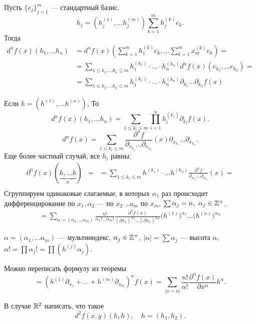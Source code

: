 \begin{thm}[частный случай, $ X = \R^{m} ~\R^{n}$]
    Пусть $ \{e_j\}_{j=1}^{m}$ --- стандартный базис.
    \[
	h_j = \left( h_j^{(1)}, \ldots h_j^{(m)} \right)  \sum_{k=1}^{m} h_{j}^{(k)} e_k 
    .\] 
    Тогда
	\[
	\begin{aligned}
	d^{n}f(x) (h_1, \ldots h_n) & = d^{n}f(x) \left( \sum_{k=1}^{m} h_1^{(k)} e_k, \ldots \sum_{k=1}^{m} x_m^{(k)}e_k \right) = \\
								&= \sum_{1 \le k_1, \ldots k_n \le m}^{} h_1^{(k_1)}\cdot  \ldots  \cdot h_n^{(k_n)} d^{n}f(x)(e_{k_1}, \ldots e_{k_n}) = \\
								&= \sum_{1 \le  k_1, \ldots k_n \le m}^{}  h_1^{(k_1)} \cdot \ldots \cdot h_n^{(k_n)} \partial _{k_1} \ldots \partial _{k_n}f(x)
	\end{aligned}
	\]
\end{thm}

\begin{thm}[еще более частный случай, $ X = \R^{m} , Y = \R, h_i = h_j$ ]
	Если $ h = (h^{(1)}, \ldots h^{(n)})$, То
    \[
		d^{n}f(x) (h_1, \ldots h_n) = \sum_{1 \le k_i \le m} \prod_{i=1}^{n} h_i^{(k_j)}\partial _{ k_i } f(x)
    .\] 
	\[
		d^{n}f(x) = \sum_{1 \le k_i \le m}^{} \frac{\partial ^{n} f}{\partial _{x_{k_1}} \ldots \partial _{x_{k_n}}} (x) \partial _{x_{k_1}} \ldots \partial _{x_{k_n}} 
	.\] 
	Еще более частный случай, все $ h_i$ равны:
	\[
	\begin{aligned}
		\partial ^{n} f(x) (\underbrace{h, \ldots h}_{n}) & = 
														  & = \sum_{1 \le k_i \le m}^{} h^{(k_1)} \cdot  \ldots h^{(k_n)}\frac{\partial ^{n} f}{\partial _{x_{k_1}} \ldots \partial _{ x_{k_n} } } (x) =\\
	\end{aligned}
    \] 
	Сгруппируем одинаковые слагаемые, в которых $ \alpha _1$ раз происходит дифференцирование по $ x_1, \alpha _2$ --- по $ x_2$  \ldots $ a_m$ по  $ x_m$, $ \sum \alpha _j = n, ~ \alpha _j \in \mathbb{Z}^{+} $.
	\[
	\begin{aligned}
=\sum_{\alpha = (\alpha _1, \ldots \alpha _m)} \frac{n!}{\alpha _1! \ldots \alpha _m!} \frac{\partial ^{n}f(x)}{(\partial x_1)^{\alpha _1} \ldots (\partial x_1)^{\alpha _m}}
\bigl(h^{(1)}\bigr)^{\alpha _1} \ldots \bigl(h^{(n)}\bigr)^{\alpha _m} 
\end{aligned}
\]
\end{thm}
\begin{name}
	$ \alpha  = (\alpha_1, \ldots \alpha _m)$ ---  {\sf мультииндекс}, $ \alpha _j \in  \mathbb{Z}^{+}$,
	$ \left| \alpha  \right| = \sum \alpha _j $ --- {\sf высота}  $ \alpha $,
    $ \alpha !  = \prod \alpha _j ! = \prod (h^{(j)}{\alpha _j})$.
\end{name}
Можно переписать формулу из теоремы
\[
    = \left(h^{(1)} \partial _{x_1} + \ldots + h^{(m)} \partial _{x_m}\right)^{n } f(x) = \sum_{\lvert \alpha = n \rvert }^{} \frac{n! }{\alpha !} \frac{\partial ^{n} f(x)}{\partial x^{\alpha }} h^{\alpha }
.\] 
\begin{prac}
    В случае $ \mathbb{R}^2$ написать, что такое
    \[
	d^2f(x, y)(h, h) , \quad h = (h_1, h_2)
    .\] 
\end{prac}
